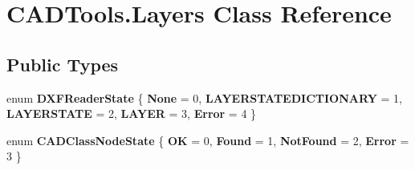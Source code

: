 \hypertarget{class_c_a_d_tools_1_1_layers}{}\section{C\+A\+D\+Tools.\+Layers Class Reference}
\label{class_c_a_d_tools_1_1_layers}
\subsection*{Public Types}
\begin{DoxyCompactItemize}
\item 
\mbox{\label{class_c_a_d_tools_1_1_layers_a6065a5e9c560684c30b77f233dda486a}} 
enum {\bfseries D\+X\+F\+Reader\+State} \{ \newline
{\bfseries None} = 0, 
{\bfseries L\+A\+Y\+E\+R\+S\+T\+A\+T\+E\+D\+I\+C\+T\+I\+O\+N\+A\+RY} = 1, 
{\bfseries L\+A\+Y\+E\+R\+S\+T\+A\+TE} = 2, 
{\bfseries L\+A\+Y\+ER} = 3, 
\newline
{\bfseries Error} = 4
 \}
\item 
\mbox{\label{class_c_a_d_tools_1_1_layers_ab96148157d64d927af031301e97cc767}} 
enum {\bfseries C\+A\+D\+Class\+Node\+State} \{ {\bfseries OK} = 0, 
{\bfseries Found} = 1, 
{\bfseries Not\+Found} = 2, 
{\bfseries Error} = 3
 \}
\end{DoxyCompactItemize}
